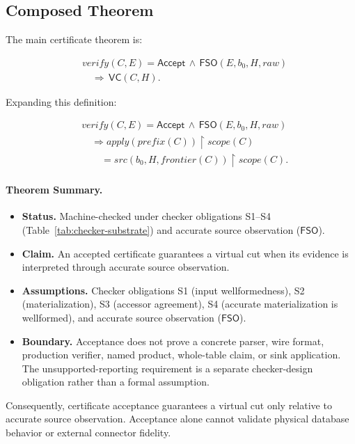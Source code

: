 \documentclass[letterpaper,10pt,twocolumn]{article}
\newcommand{\restrict}{\mathbin{\upharpoonright}}
\newcommand{\Apply}{\mathit{apply}}
\newcommand{\Src}{\mathit{src}}
\newcommand{\Scope}{\mathit{scope}}
\newcommand{\Frontier}{\mathit{frontier}}
\newcommand{\CleanPrefix}{\mathit{prefix}}
\newcommand{\Verify}{\mathit{verify}}
\newcommand{\RawObs}{\mathit{raw}}
\newcommand{\FSO}{\mathsf{FSO}}
\newcommand{\VC}{\mathsf{VC}}
\newcommand{\Accept}{\mathsf{Accept}}
\providecommand{\tightlist}{\setlength{\itemsep}{0pt}\setlength{\parskip}{0pt}}
\begin{document}
\subsection{Composed Theorem}\label{composed-theorem}

The main certificate theorem is:

\[
\begin{aligned}
&\Verify(C,E)=\Accept \,\land\, \FSO(E,b_0,H,\RawObs)\\
&\quad\Longrightarrow\, \VC(C,H).
\end{aligned}
\]

Expanding this definition:

\[
\begin{aligned}
&\Verify(C,E)=\Accept \,\land\, \FSO(E,b_0,H,\RawObs)\\
&\quad\Longrightarrow
  \Apply(\CleanPrefix(C)) \restrict \Scope(C)\\
&\qquad= \Src(b_0,H,\Frontier(C)) \restrict \Scope(C).
\end{aligned}
\]

\paragraph*{Theorem Summary.}
\begin{itemize}
\tightlist
\item
  \textbf{Status.} Machine-checked under
  checker obligations S1--S4 (Table~\ref{tab:checker-substrate})
  and accurate source observation ($\FSO$).
\item
  \textbf{Claim.} An accepted certificate guarantees a virtual cut
  when its evidence is interpreted through accurate source observation.
\item
  \textbf{Assumptions.} Checker obligations S1 (input
  wellformedness), S2 (materialization), S3 (accessor agreement),
  S4 (accurate materialization is wellformed), and accurate source
  observation ($\FSO$).
\item
  \textbf{Boundary.} Acceptance does not prove a concrete parser, wire
  format, production verifier, named product, whole-table claim, or sink
  application. The unsupported-reporting requirement is a separate
  checker-design obligation rather than a formal assumption.
\end{itemize}

Consequently, certificate acceptance guarantees a virtual cut only relative
to accurate source observation. Acceptance alone cannot validate
physical database behavior or external connector fidelity.
\end{document}
